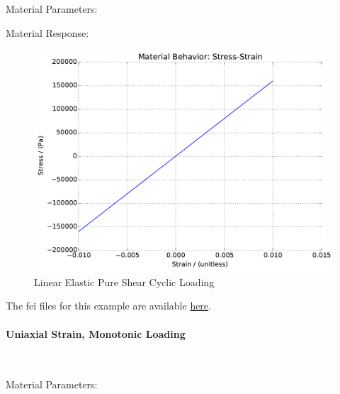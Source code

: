 \documentclass[fleqn,11pt]{article}
\begin{document}
Material Parameters:


Material Response:
\begin{figure}[H]
\begin{center}
\includegraphics[width=12cm]{../fei_examples/linear_elastic/2pure_shear_cyclic_loading/result.pdf}
\caption{
\label{Linear Elastic Solid_Pure Shear Cyclic Loadin}
Linear Elastic Pure Shear Cyclic Loading}
\end{center}
\end{figure}

The fei files for this example are available \href{https://github.com/yuan-energy/education_examples/tree/master/fei_examples/linear_elastic/2pure_shear_cyclic_loading}{here}.

\newpage
\paragraph{Uniaxial Strain, Monotonic Loading} ~ 

Material Parameters:

\end{document}
